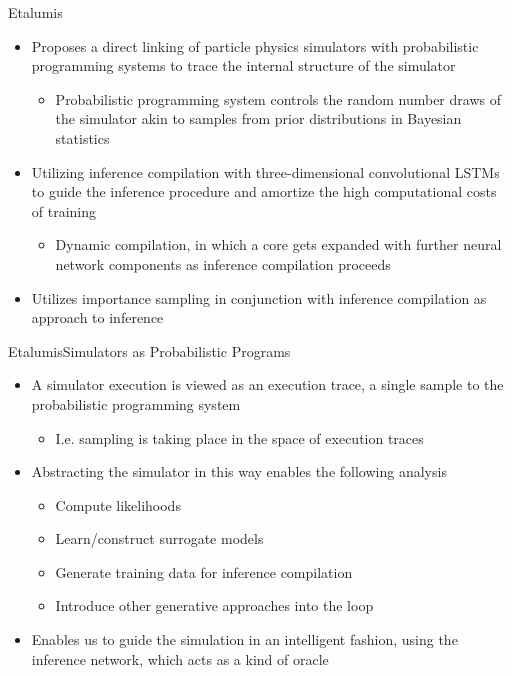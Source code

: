 \documentclass[AERbeamer%
              ,optEnglish%
              ,optBiber%
              ,optBibstyleAlphabetic%
              ,optBeamerClassicFormat%
              ]{AERlatex}%
\begin{document}
\begin{frame}[c]{Etalumis}
    \centering
    \begin{itemize}
        \item Proposes a direct linking of particle physics simulators with probabilistic programming systems to trace the
              internal structure of the simulator
        \begin{itemize}
            \item Probabilistic programming system controls the random number draws of the simulator akin to samples from
                  prior distributions in Bayesian statistics
        \end{itemize}
        \item Utilizing inference compilation with three-dimensional convolutional LSTMs to guide the inference procedure
              and amortize the high computational costs of training
        \begin{itemize}
            \item Dynamic compilation, in which a core gets expanded with further neural network components as inference compilation
                  proceeds
        \end{itemize}
        \item Utilizes importance sampling in conjunction with inference compilation as approach to inference
    \end{itemize}
\end{frame}


\begin{frame}[c]{Etalumis}{Simulators as Probabilistic Programs}
    \centering
    \begin{itemize}
        \item A simulator execution is viewed as an execution trace, a single sample to the probabilistic programming system
        \begin{itemize}
            \item I.e. sampling is taking place in the space of execution traces
        \end{itemize}
        \item Abstracting the simulator in this way enables the following analysis
        \begin{itemize}
            \item Compute likelihoods
            \item Learn/construct surrogate models
            \item Generate training data for inference compilation
            \item Introduce other generative approaches into the loop
        \end{itemize}
        \item Enables us to guide the simulation in an intelligent fashion, using the inference network, which acts as a kind of oracle
    \end{itemize}
\end{frame}
\end{document}
